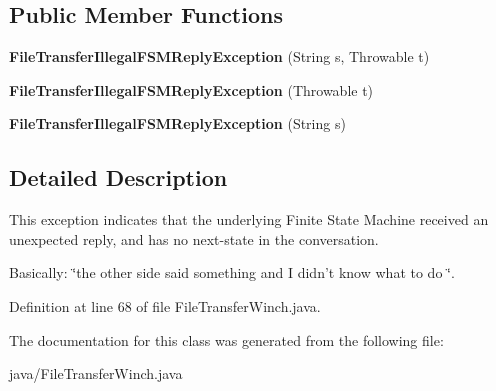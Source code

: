 \subsection*{Public Member Functions}
\begin{DoxyCompactItemize}
\item 
{\bfseries File\-Transfer\-Illegal\-F\-S\-M\-Reply\-Exception} (String s, Throwable t)\label{classorg_1_1smallfoot_1_1filexfer_1_1FileTransferWinch_1_1FileTransferIllegalFSMReplyException_ad27ca86ec85b2c39c339bdaf0eee3560}

\item 
{\bfseries File\-Transfer\-Illegal\-F\-S\-M\-Reply\-Exception} (Throwable t)\label{classorg_1_1smallfoot_1_1filexfer_1_1FileTransferWinch_1_1FileTransferIllegalFSMReplyException_a4e8ffe04c5de02a5750e97613ef40af8}

\item 
{\bfseries File\-Transfer\-Illegal\-F\-S\-M\-Reply\-Exception} (String s)\label{classorg_1_1smallfoot_1_1filexfer_1_1FileTransferWinch_1_1FileTransferIllegalFSMReplyException_a2e552ceb66966a3493c3c47227d5ba6c}

\end{DoxyCompactItemize}


\subsection{Detailed Description}
This exception indicates that the underlying Finite State Machine received an unexpected reply, and has no next-\/state in the conversation. 

Basically\-: \char`\"{}the other side said something and I didn't know what to do \char`\"{}. 

Definition at line 68 of file File\-Transfer\-Winch.\-java.



The documentation for this class was generated from the following file\-:\begin{DoxyCompactItemize}
\item 
java/File\-Transfer\-Winch.\-java\end{DoxyCompactItemize}
